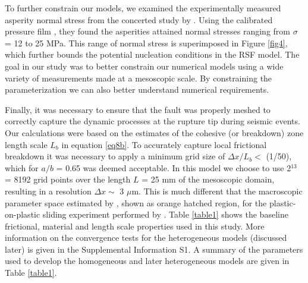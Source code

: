 \documentclass[final,3p, 11pt,authoryear]{elsarticle}
\begin{document}
To further constrain our models, we examined the experimentally measured asperity normal stress from the concerted study by \citet{Selvadurai2017}. Using the calibrated pressure film \citep{Selvadurai2015}, they found the asperities attained normal stresses ranging from $\sigma$ = 12 to 25 MPa. This range of normal stress is superimposed in Figure \ref{fig4}, which further bounds the potential nucleation conditions in the RSF model.  The goal in our study was to better constrain our numerical models using a wide variety of measurements made at a mesoscopic scale.  By constraining the parameterization we can also better understand numerical requirements.  

Finally, it was necessary to ensure that the fault was properly meshed to correctly capture the dynamic processes at the rupture tip during seismic events. Our calculations were based on the estimates of the cohesive (or breakdown) zone length scale $L_{b}$ in equation \eqref{eq8b}. To accurately capture local frictional breakdown it was necessary to apply a minimum grid size of $\Delta x/L_{b} <$ (1/50), which for $a/b$ = 0.65 was deemed acceptable.  In this model we choose to use 2$^{13}$ = 8192 grid points over the length $L$ = 25 mm of the mesoscopic domain, resulting in a resolution $\Delta x \sim$  3 $\mu$m. This is much different that the macroscopic parameter space estimated by \citet{Kaneko2016}, shown as orange hatched region, for the plastic-on-plastic sliding experiment performed by \citet{Latour2013}. Table \ref{table1} shows the baseline frictional, material and length scale properties used in this study. More information on the convergence tests for the heterogeneous models (discussed later) is given in the Supplemental Information S1. A summary of the parameters used to develop the homogeneous and later heterogeneous models are given in Table \ref{table1}.
\end{document}
